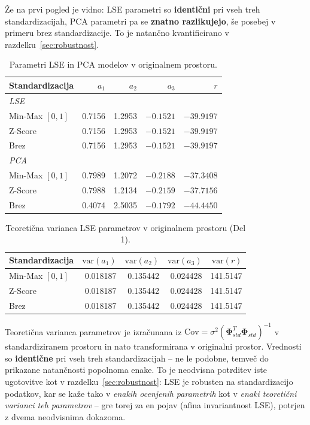 \documentclass[a4paper, 11pt]{article}
\begin{document}
Že na prvi pogled je vidno: LSE parametri so \textbf{identični} pri vseh treh
standardizacijah, PCA parametri pa se \textbf{znatno razlikujejo}, še posebej v primeru
brez standardizacije. To je natančno kvantificirano v razdelku~\ref{sec:robustnost}.

\begin{table}[H]
\centering
\caption{Parametri LSE in PCA modelov v originalnem prostoru.}
\label{tab:part1-params}
\begin{tabular}{lrrrr}
\toprule
Standardizacija & $a_1$ & $a_2$ & $a_3$ & $r$ \\
\midrule
\multicolumn{5}{l}{\textit{LSE}} \\
Min-Max $[0,1]$ & 0.7156 & 1.2953 & $-0.1521$ & $-39.9197$ \\
Z-Score         & 0.7156 & 1.2953 & $-0.1521$ & $-39.9197$ \\
Brez            & 0.7156 & 1.2953 & $-0.1521$ & $-39.9197$ \\
\midrule
\multicolumn{5}{l}{\textit{PCA}} \\
Min-Max $[0,1]$ & 0.7989 & 1.2072 & $-0.2188$ & $-37.3408$ \\
Z-Score         & 0.7988 & 1.2134 & $-0.2159$ & $-37.7156$ \\
Brez            & 0.4074 & 2.5035 & $-0.1792$ & $-44.4450$ \\
\bottomrule
\end{tabular}
\end{table}

\begin{table}[H]
\centering
\caption{Teoretična varianca LSE parametrov v originalnem prostoru (Del 1).}
\label{tab:part1-var}
\begin{tabular}{lrrrr}
\toprule
Standardizacija & $\mathrm{var}(a_1)$ & $\mathrm{var}(a_2)$ & $\mathrm{var}(a_3)$ & $\mathrm{var}(r)$ \\
\midrule
Min-Max $[0,1]$ & 0.018187 & 0.135442 & 0.024428 & 141.5147 \\
Z-Score         & 0.018187 & 0.135442 & 0.024428 & 141.5147 \\
Brez            & 0.018187 & 0.135442 & 0.024428 & 141.5147 \\
\bottomrule
\end{tabular}
\end{table}

Teoretična varianca parametrov je izračunana iz $\mathrm{Cov} = \sigma^2(\mathbf{\Phi}_{std}^T\mathbf{\Phi}_{std})^{-1}$
v standardiziranem prostoru in nato transformirana v originalni prostor. Vrednosti so
\textbf{identične} pri vseh treh standardizacijah -- ne le podobne, temveč do prikazane
natančnosti popolnoma enake. To je neodvisna potrditev iste ugotovitve kot v
razdelku~\ref{sec:robustnost}: LSE je robusten na standardizacijo podatkov, kar se kaže
tako v \emph{enakih ocenjenih parametrih} kot v \emph{enaki teoretični varianci teh
parametrov} -- gre torej za en pojav (afina invariantnost LSE), potrjen z dvema
neodvisnima dokazoma.
\end{document}
